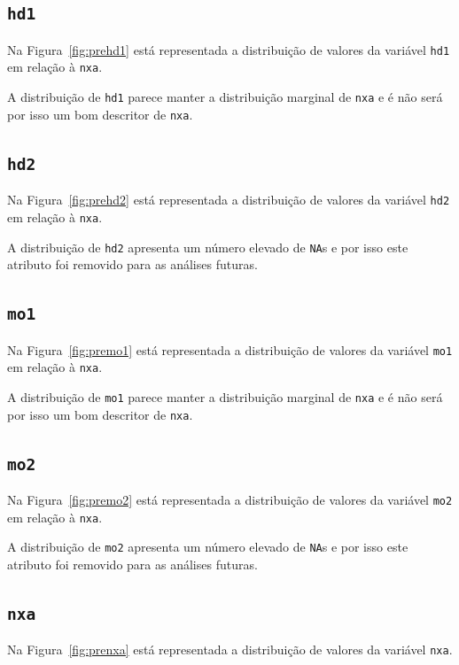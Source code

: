 \documentclass[10pt, conference, compsocconf]{IEEEtran}
\begin{document}
\subsection{\texttt{hd1}}
Na Figura~\ref{fig:prehd1} está representada a distribuição de valores
da variável {\tt hd1} em relação à {\tt nxa}.


A distribuição de {\tt hd1} parece manter a distribuição marginal de
{\tt nxa} e é não será por isso um bom descritor de {\tt nxa}.

\subsection{\texttt{hd2}}
Na Figura~\ref{fig:prehd2} está representada a distribuição de valores
da variável {\tt hd2} em relação à {\tt nxa}.


A distribuição de {\tt hd2} apresenta um número elevado de {\tt NA}s e
por isso este atributo foi removido para as análises futuras.

\subsection{\texttt{mo1}}
Na Figura~\ref{fig:premo1} está representada a distribuição de valores
da variável {\tt mo1} em relação à {\tt nxa}.


A distribuição de {\tt mo1} parece manter a distribuição marginal de
{\tt nxa} e é não será por isso um bom descritor de {\tt nxa}.

\subsection{\texttt{mo2}}
Na Figura~\ref{fig:premo2} está representada a distribuição de valores
da variável {\tt mo2} em relação à {\tt nxa}.


A distribuição de {\tt mo2} apresenta um número elevado de {\tt NA}s e
por isso este atributo foi removido para as análises futuras.

\subsection{\texttt{nxa}}
Na Figura~\ref{fig:prenxa} está representada a distribuição de valores
da variável {\tt nxa}.
\end{document}
